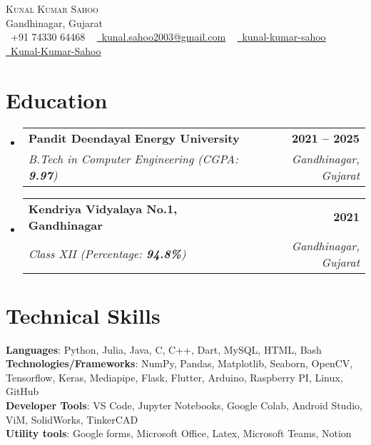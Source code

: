 \documentclass[letterpaper,11pt]{article}
\makeatletter
\newcommand{\resumeSubheading}[4]{
  \vspace{-2pt}\item
    \begin{tabular*}{1.0\textwidth}[t]{l@{\extracolsep{\fill}}r}
      \textbf{#1} & \textbf{\small #2} \\
      \textit{\small#3} & \textit{\small #4} \\
    \end{tabular*}\vspace{-7pt}
}
\newcommand{\resumeSubHeadingListStart}{\begin{itemize}[leftmargin=0.0in, label={}]}
\newcommand{\resumeSubHeadingListEnd}{\end{itemize}}
\makeatother
\begin{document}

\begin{center}
    {\Huge \scshape Kunal Kumar Sahoo} \\ \vspace{1pt}
    Gandhinagar, Gujarat \\ \vspace{1pt}
    \small \raisebox{-0.1\height}\faPhone\ +91 74330 64468 ~ \href{mailto:kunal.sahoo2003@gmail.com}{\raisebox{-0.2\height}\faEnvelope\  \underline{kunal.sahoo2003@gmail.com}} ~ 
    \href{https://linkedin.com/in//}{\raisebox{-0.2\height}\faLinkedin\ \underline{kunal-kumar-sahoo}}  ~
    \href{https://github.com/}{\raisebox{-0.2\height}\faGithub\ \underline{Kunal-Kumar-Sahoo}}
    \vspace{-8pt}
\end{center}


\section{Education}
  \resumeSubHeadingListStart
    \resumeSubheading
      {Pandit Deendayal Energy University}{2021 -- 2025}
      {B.Tech in Computer Engineering (CGPA: \textbf{9.97})}{Gandhinagar, Gujarat}
    \resumeSubheading  
      {Kendriya Vidyalaya No.1, Gandhinagar}{2021}
      {Class XII (Percentage: \textbf{94.8\%})}{Gandhinagar, Gujarat}
  \resumeSubHeadingListEnd

\section{Technical Skills}

 \begin{itemize}[leftmargin=0.15in, label={}]
    \small{\item{
     \textbf{Languages}{: Python, Julia, Java, C, C++, Dart, MySQL, HTML, Bash} \\
     \textbf{Technologies/Frameworks}{: NumPy, Pandas, Matplotlib, Seaborn, OpenCV, Tensorflow, Keras, Mediapipe, Flask, Flutter, Arduino, Raspberry PI, Linux, GitHub} \\
     }
     \textbf{Developer Tools}{: VS Code, Jupyter Notebooks, Google Colab, Android Studio, ViM, SolidWorks, TinkerCAD} \\
     \textbf{Utility tools}{: Google forms, Microsoft Office, Latex, Microsoft Teams, Notion}
     }
 \end{itemize}
 \vspace{-16pt}
\end{document}
